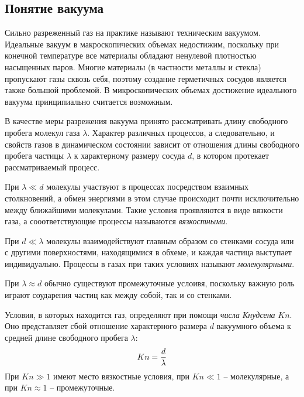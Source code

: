 \documentclass[12pt]{article}
\begin{document}
\subsection*{Понятие вакуума}
\par Сильно разреженный газ на практике называют техническим вакуумом. Идеальные вакуум в макроскопических объемах недостижим, поскольку при конечной температуре все материалы обладают ненулевой плотностью насыщенных паров. Многие материалы (в частности металлы и стекла) пропускают газы сквозь себя, поэтому создание герметичных сосудов является также большой проблемой. В микроскопических объемах достижение идеального вакуума принципиально считается возможным. \par
В качестве меры разрежения вакуума принято рассматривать длину свободного пробега молекул газа $\lambda$. Характер различных процессов, а следовательно, и свойств газов в динамическом состоянии зависит от отношения длины свободного пробега частицы $\lambda$ к характерному размеру сосуда $d$, в котором протекает рассматриваемый процесс. \par
При $\lambda \ll d$ молекулы участвуют в процессах посредством взаимных столкновений, а обмен энергиями в этом случае происходит почти исключительно между ближайшими молекулами. Такие условия проявляются в виде вязкости газа, а сооответствующие процессы называются \textit{вязкостными}. \par
При $d \ll \lambda$ молекулы взаимодействуют главным образом со стенками сосуда или с другими поверхностями, находящимися в обхеме, и каждая частица выступает индивидуально. Процессы в газах при таких условиях называют \textit{молекулярными}. \par
При $\lambda \approx d$ обычно существуют промежуточные услоивя, поскольку важную роль играют соударения частиц как между собой, так и со стенками. \par
Условия, в которых находится газ, определяют при помощи \textit{числа Кнудсена} $Kn$. Оно представляет сбой отношение характерного размера $d$ вакуумного объема к средней длине свободного пробега $\lambda$:
\begin{gather}
	Kn = \frac{d}{\lambda} \notag
\end{gather}
При $Kn \gg 1$ имеют место вязкостные условия, при $Kn \ll 1$ -- молекулярные, а при $Kn \approx 1$ -- промежуточные.\par
\end{document}
